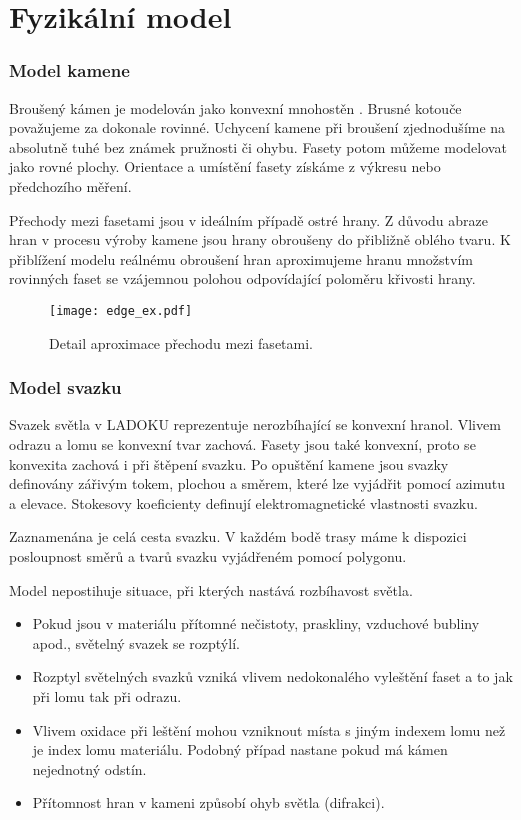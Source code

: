 \part{Fyzikální model}

\section{Model kamene}
Broušený kámen je modelován jako konvexní mnohostěn \cite{Pohl2002}. Brusné kotouče považujeme za dokonale rovinné. Uchycení kamene při broušení zjednodušíme na absolutně tuhé bez známek pružnosti či ohybu. Fasety potom můžeme modelovat jako rovné plochy. Orientace a umístění fasety získáme z výkresu nebo předchozího měření. 

Přechody mezi fasetami jsou v ideálním případě ostré hrany. Z důvodu abraze hran v procesu výroby kamene jsou hrany obroušeny do přibližně oblého tvaru. K přiblížení modelu reálnému obroušení hran aproximujeme hranu množstvím rovinných faset se vzájemnou polohou odpovídající poloměru křivosti hrany.  
  
\begin{figure}[htps]
\centering
\texttt{[image: edge\_ex.pdf]}
\caption{Detail aproximace přechodu mezi fasetami.}
\label{fig: edge}
\end{figure}  

\section{Model svazku}
Svazek světla v LADOKU reprezentuje nerozbíhající se konvexní hranol. Vlivem odrazu a lomu se konvexní tvar zachová. Fasety jsou také konvexní, proto se konvexita zachová i při štěpení svazku. Po opuštění kamene jsou svazky definovány zářivým tokem, plochou a směrem, které lze vyjádřit pomocí azimutu a elevace. Stokesovy koeficienty definují elektromagnetické vlastnosti svazku. 

Zaznamenána je celá cesta svazku. V každém bodě trasy máme k dispozici posloupnost směrů a tvarů svazku vyjádřeném pomocí polygonu. 

Model nepostihuje situace, při kterých nastává rozbíhavost světla.
\begin{itemize}
\item Pokud jsou v materiálu přítomné nečistoty, praskliny, vzduchové bubliny apod., světelný svazek se rozptýlí.
\item  Rozptyl světelných svazků vzniká vlivem nedokonalého vyleštění faset a to jak při lomu tak při odrazu.
\item Vlivem oxidace při leštění mohou vzniknout místa s jiným indexem lomu než je index lomu materiálu. Podobný případ nastane pokud má kámen nejednotný odstín.

\item Přítomnost hran v kameni způsobí ohyb světla (difrakci).
\end{itemize}


